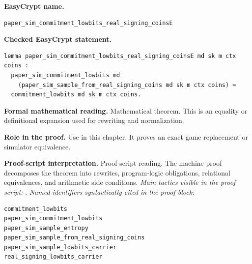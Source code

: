 \begin{formaltheorem}
\noindent\textbf{EasyCrypt name.}
\begin{lstlisting}[language=EasyCrypt,basicstyle=\ttfamily\scriptsize]
paper_sim_commitment_lowbits_real_signing_coinsE
\end{lstlisting}
\noindent\textbf{Checked EasyCrypt statement.}
\begin{lstlisting}[language=EasyCrypt,basicstyle=\ttfamily\scriptsize]
lemma paper_sim_commitment_lowbits_real_signing_coinsE md sk m ctx coins :
  paper_sim_commitment_lowbits md
    (paper_sim_sample_from_real_signing_coins md sk m ctx coins) =
  commitment_lowbits md sk m ctx coins.
\end{lstlisting}
\noindent\textbf{Formal mathematical reading.}
Mathematical theorem. This is an equality or definitional expansion used for rewriting and normalization.

\noindent\textbf{Role in the proof.}
Use in this chapter. It proves an exact game replacement or simulator equivalence.

\noindent\textbf{Proof-script interpretation.}
Proof-script reading. The machine proof decomposes the theorem into rewrites, program-logic obligations, relational equivalences, and arithmetic side conditions.
\emph{Main tactics visible in the proof script:} .
\emph{Named identifiers syntactically cited in the proof block:}
\begin{lstlisting}[language=EasyCrypt,basicstyle=\ttfamily\scriptsize]
commitment_lowbits
paper_sim_commitment_lowbits
paper_sim_sample_entropy
paper_sim_sample_from_real_signing_coins
paper_sim_sample_lowbits_carrier
real_signing_lowbits_carrier
\end{lstlisting}

\end{formaltheorem}

